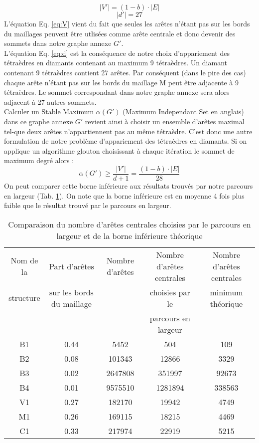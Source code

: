 \begin{equation}
\label{eq:V}
|V'|=(1-b)\cdot |E|
\end{equation}
\begin{equation}
\label{eq:d}
|d'|= 27
\end{equation}
L'équation Eq. \ref{eq:V} vient du fait que seules les arêtes n'étant pas sur les bords du maillages peuvent être utlisées comme arête centrale et donc devenir des sommets dans notre graphe annexe $G'$.\\
L'équation Eq. \ref{eq:d} est la conséquence de notre choix d'appariement des tétraèdres en diamants contenant au maximum 9 tétraèdres. Un diamant contenant 9 tétraèdres contient 27 arêtes. Par conséquent (dans le pire des cas) chaque arête n'étant pas sur les bords du maillage M peut être adjacente à 9 tétraèdres. Le sommet correspondant dans notre graphe annexe sera alors adjacent à 27 autres sommets.\\
Calculer un Stable Maximum $\alpha(G')$ (Maximum Independant Set en anglais) dans ce graphe annexe $G'$ revient ainsi à choisir un ensemble d'arêtes maximal tel-que deux arêtes n'appartiennent pas au même tétraèdre. C'est donc une autre formulation de notre problème d'appariement des tétraèdres en diamants. Si on applique un algorithme glouton choisissant à chaque itération le sommet de maximum degré alors :
\begin{equation}
\alpha(G')\geqslant \frac{|V'|}{d+1} = \frac{(1-b)\cdot |E|}{28}
\end{equation}
On peut comparer cette borne inférieure aux résultats trouvés par notre parcours en largeur (Tab. \ref{tab:borne_inf_theorique}). On note que la borne inférieure est en moyenne 4 fois plus faible que le résultat trouvé par le parcours en largeur.
\begin{table}[h]
\footnotesize
\centering
\begin{tabular}{| c | c | c | c | c|}
\hline
Nom de la & Part d'arêtes & Nombre d'arêtes& Nombre d'arêtes centrales & Nombre d'arêtes centrales\\
structure & sur les bords du maillage & &choisies par le & minimum théorique\\
& & & parcours en largeur & \\
\hline
B1 & 0.44 & 5452 & 504 & 109 \\
B2 & 0.08 & 101343 & 12866 & 3329\\
B3 & 0.02 & 2647808 & 351997 & 92673 \\
B4 & 0.01 & 9575510 & 1281894 & 338563  \\
V1 & 0.27 & 182170 & 19942 & 4749 \\
M1 & 0.26 & 169115 & 18215 & 4469 \\
C1 & 0.33 & 217974 & 22919 & 5215\\
\hline  
\end{tabular}
\caption{Comparaison du nombre d'arêtes centrales choisies par le parcours en largeur et de la borne inférieure théorique}
\label{tab:borne_inf_theorique}
\end{table}


